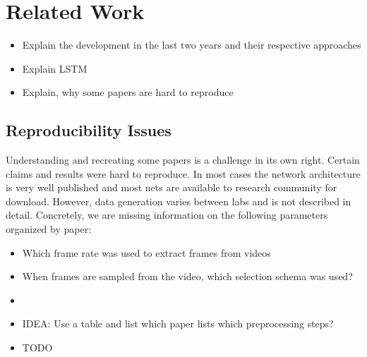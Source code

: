 \section{Related Work}
\label{sec:related}


\begin{itemize}
	\item Explain the development in the last two years and their respective approaches
    \item Explain LSTM
	\item Explain, why some papers are hard to reproduce
\end{itemize}

\subsection*{Reproducibility Issues}
Understanding and recreating some papers is a challenge in its own right. Certain claims and results were hard to reproduce. In most cases the network architecture is very well published and most nets are available to research community for download. However, data generation varies between labs and is not described in detail.
Concretely, we are missing information on the following parameters organized by paper:
\begin{itemize}
	\item Which frame rate was used to extract frames from videos
	\item When frames are sampled from the video, which selection schema was used?
	\item
	\item IDEA: Use a table and list which paper lists which preprocessing steps?
	\item TODO
\end{itemize}